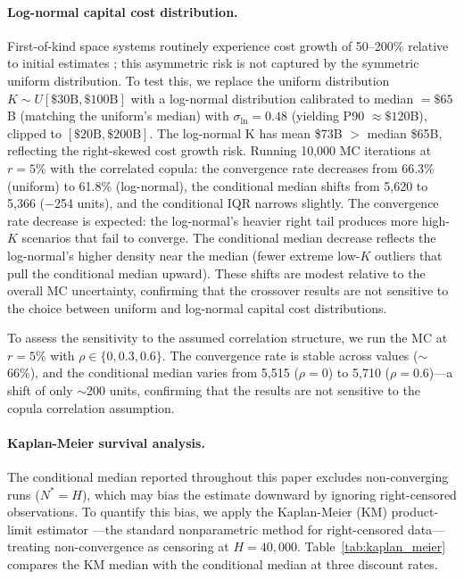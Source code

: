 \documentclass[preprint,12pt]{elsarticle}
\begin{document}
\paragraph{Log-normal capital cost distribution.} First-of-kind space systems routinely experience cost growth of 50--200\% relative to initial estimates \cite{wertz2011}; this asymmetric risk is not captured by the symmetric uniform distribution. To test this, we replace the uniform distribution $K \sim U[\$30\text{B}, \$100\text{B}]$ with a log-normal distribution calibrated to median $= \$65$B (matching the uniform's median) with $\sigma_{\ln} = 0.48$ (yielding P90 $\approx \$120$B), clipped to $[\$20\text{B}, \$200\text{B}]$. The log-normal K has mean \$73B $>$ median \$65B, reflecting the right-skewed cost growth risk. Running 10{,}000 MC iterations at $r = 5\%$ with the correlated copula: the convergence rate decreases from 66.3\% (uniform) to 61.8\% (log-normal), the conditional median shifts from 5{,}620 to 5{,}366 ($-$254 units), and the conditional IQR narrows slightly. The convergence rate decrease is expected: the log-normal's heavier right tail produces more high-$K$ scenarios that fail to converge. The conditional median decrease reflects the log-normal's higher density near the median (fewer extreme low-$K$ outliers that pull the conditional median upward). These shifts are modest relative to the overall MC uncertainty, confirming that the crossover results are not sensitive to the choice between uniform and log-normal capital cost distributions.

To assess the sensitivity to the assumed correlation structure, we run the MC at $r = 5\%$ with $\rho \in \{0, 0.3, 0.6\}$. The convergence rate is stable across values ($\sim$66\%), and the conditional median varies from 5{,}515 ($\rho = 0$) to 5{,}710 ($\rho = 0.6$)---a shift of only $\sim$200 units, confirming that the results are not sensitive to the copula correlation assumption.

\paragraph{Kaplan-Meier survival analysis.} The conditional median reported throughout this paper excludes non-converging runs ($N^* = H$), which may bias the estimate downward by ignoring right-censored observations. To quantify this bias, we apply the Kaplan-Meier (KM) product-limit estimator \cite{kaplan1958}---the standard nonparametric method for right-censored data---treating non-convergence as censoring at $H = 40{,}000$. Table~\ref{tab:kaplan_meier} compares the KM median with the conditional median at three discount rates.
\end{document}
